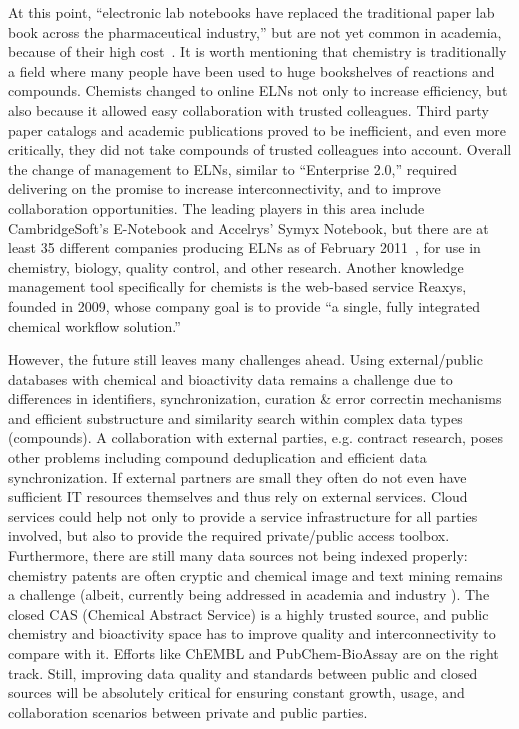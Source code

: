 \documentclass{sig-alternate}
\begin{document}
At this point, ``electronic lab notebooks have replaced the
traditional paper lab book across the pharmaceutical industry,'' but
are not yet common in academia, because of their high
cost~\cite{WavingGoodbye}.  It is worth mentioning that chemistry is
traditionally a field where many people have been used to huge
bookshelves of reactions and compounds. Chemists changed to online
ELNs not only to increase efficiency, but also because it allowed easy  
collaboration with trusted colleagues. Third party paper catalogs and
academic publications proved to be inefficient, and even more
critically, they did not take compounds of trusted colleagues into
account. Overall the change of management to ELNs, similar to
``Enterprise 2.0,'' required delivering on the promise to increase
interconnectivity, and to improve collaboration opportunities.  The
leading players in this area include CambridgeSoft's E-Notebook and
Accelrys' Symyx Notebook, but there are at least 35 different
companies producing ELNs as of February 2011~\cite{ELNreview}, for use
in chemistry, biology, quality control, and other research.  Another
knowledge management tool specifically for chemists is the web-based
service Reaxys, founded in 2009, whose company goal is to provide ``a
single, fully integrated chemical workflow solution.''

However, the future still leaves many challenges ahead. Using
external/public databases with chemical and bioactivity data remains a
challenge due to differences in identifiers, synchronization, curation
\& error correctin mechanisms and efficient substructure and
similarity search within complex data types (compounds). A
collaboration with external parties, e.g. contract research, poses
other problems including compound deduplication and efficient data
synchronization. If external partners are small they often do not even
have sufficient IT resources themselves and thus rely on external
services. Cloud services could help not only to provide a service
infrastructure for all parties involved, but also to provide the
required private/public access toolbox. Furthermore, there are still
many data sources not being indexed properly: chemistry patents are
often cryptic and chemical image and text mining remains a challenge
(albeit, currently being addressed in academia and industry
\cite{Jessop:2011fk,Sayle:2009uq}). The closed CAS (Chemical Abstract
Service) is a highly trusted source, and public chemistry and
bioactivity space has to improve quality and interconnectivity to
compare with it. Efforts like ChEMBL and PubChem-BioAssay are on the
right track. Still, improving data quality and standards between
public and closed sources will be absolutely critical for ensuring
constant growth, usage, and collaboration scenarios between private
and public parties.
\end{document}
